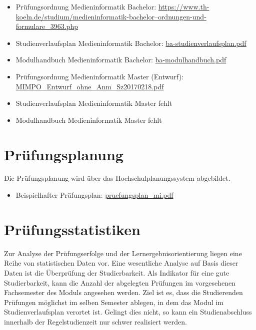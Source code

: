 \begin{itemize}
\item
  Prüfungsordnung Medieninformatik Bachelor:
  \href{https://www.th-koeln.de/studium/medieninformatik-bachelor--ordnungen-und-formulare_3963.php}{https://www.th-koeln.de/studium/medieninformatik-bachelor--ordnungen-und-formulare\_3963.php}
\item
  Studienverlaufsplan Medieninformatik Bachelor:
  \href{../anhaenge/ba-studienverlaufsplan.pdf}{ba-studienverlaufsplan.pdf}
\item
  Modulhandbuch Medieninformatik Bachelor:
  \href{../anhaenge/ba-modulhandbuch.pdf}{ba-modulhandbuch.pdf}
\item
  Prüfungsordnung Medieninformatik Master (Entwurf):
  \href{../anhaenge/MIMPO_Entwurf_ohne_Anm_Sz20170218.pdf}{MIMPO\_Entwurf\_ohne\_Anm\_Sz20170218.pdf}
\item
  Studienverlaufsplan Medieninformatik Master fehlt
\item
  Modulhandbuch Medieninformatik Master fehlt
\end{itemize}

\section{Prüfungsplanung}\label{pruxfcfungsplanung}

Die Prüfungsplanung wird über das Hochschulplanungssystem abgebildet.

\begin{itemize}
\tightlist
\item
  Beispielhafter Prüfungsplan:
  \href{../anhaenge/pruefungsplan_mi.pdf}{pruefungsplan\_mi.pdf}
\end{itemize}

\section{Prüfungsstatistiken}\label{pruxfcfungsstatistiken}

Zur Analyse der Prüfungserfolge und der Lernergebnisorientierung liegen
eine Reihe von statistischen Daten vor. Eine wesentliche Analyse auf
Basis dieser Daten ist die Überprüfung der Studierbarkeit. Als Indikator
für eine gute Studierbarkeit, kann die Anzahl der abgelegten Prüfungen
im vorgesehenen Fachsemester des Moduls angesehen werden. Ziel ist es,
dass die Studierenden Prüfungen möglichst im selben Semester ablegen, in
dem das Modul im Studienverlaufsplan verortet ist. Gelingt dies nicht,
so kann ein Studienabschluss innerhalb der Regelstudienzeit nur schwer
realisiert werden.

